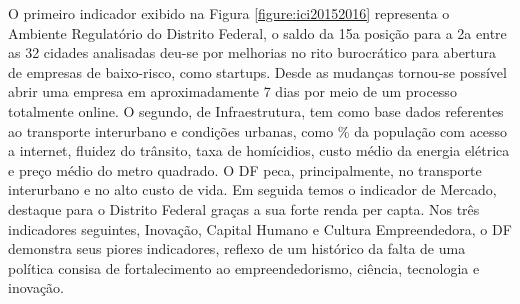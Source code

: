 O primeiro indicador exibido na Figura \ref{figure:ici20152016} representa o Ambiente Regulatório do Distrito Federal, o saldo da 15a posição para a 2a entre as 32 cidades analisadas deu-se por melhorias no rito burocrático para abertura de empresas de baixo-risco, como startups. Desde as mudanças tornou-se possível abrir uma empresa em aproximadamente 7 dias por meio de um processo totalmente online. O segundo, de Infraestrutura, tem como base dados referentes ao transporte interurbano e condições urbanas, como \% da população com acesso a internet, fluidez do trânsito, taxa de homícidios, custo médio da energia elétrica e preço médio do metro quadrado. O DF peca, principalmente, no transporte interurbano e no alto custo de vida. Em seguida temos o indicador de Mercado, destaque para o Distrito Federal graças a sua forte renda per capta. Nos três indicadores seguintes, Inovação, Capital Humano e Cultura Empreendedora, o DF demonstra seus piores indicadores, reflexo de um histórico da falta de uma política consisa de fortalecimento ao empreendedorismo, ciência, tecnologia e inovação.